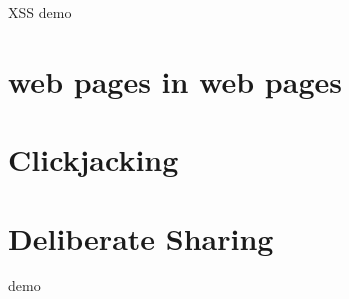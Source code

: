 \begin{frame}{XSS demo}
\end{frame}

\section{web pages in web pages}




\section{Clickjacking}

\section{Deliberate Sharing}
\begin{frame}{demo}
\end{frame}

